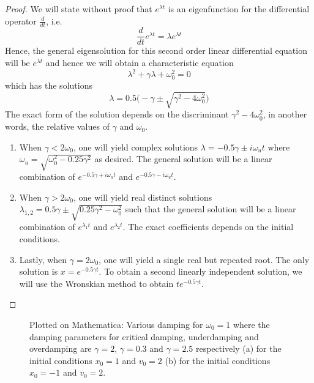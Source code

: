 \documentclass[a4paper]{article}
\begin{document}
\begin{proof}
We will state without proof that $e^{\lambda t}$ is an eigenfunction for the differential operator $\frac{d}{dt}$, i.e.
$$\frac{d}{dt}e^{\lambda t}=\lambda e^{\lambda t}$$
Hence, the general eigensolution for this second order linear differential equation will be $e^{\lambda t}$ and hence we will obtain a characteristic equation
$$\lambda^2+\gamma\lambda+\omega_0^2=0$$
which has the solutions
$$\lambda=0.5\bigg(-\gamma\pm\sqrt{\gamma^2-4\omega_0^2}\bigg)$$
The exact form of the solution depends on the discriminant $\gamma^2-4\omega_0^2$, in another words, the relative values of $\gamma$ and $\omega_0$. 
\begin{enumerate}
\item When $\gamma<2\omega_0$, one will yield complex solutions $\lambda=-0.5\gamma\pm i\omega_ut$ where $\omega_u=\sqrt{\omega_0^2-0.25\gamma^2}$ as desired. The general solution will be a linear combination of $e^{-0.5\gamma+i\omega_ut}$ and $e^{-0.5\gamma-i\omega_ut}$. \item When $\gamma>2\omega_0$, one will yield real distinct solutions $\lambda_{1,2}=0.5\gamma\pm\sqrt{0.25\gamma^2-\omega_0^2}$ such that the general solution will be a linear combination of $e^{\lambda_1 t}$ and $e^{\lambda_2t}$. The exact coefficients depends on the initial conditions. 
\item Lastly, when $\gamma=2\omega_0$, one will yield a single real but repeated root. The only solution is $x=e^{-0.5\gamma t}$. To obtain a second linearly independent solution, we will use the Wronskian method to obtain $te^{-0.5\gamma t}$.
\end{enumerate}
\end{proof}
\begin{figure}[H]
\begin{minipage}{\linewidth}
\end{minipage}
\caption{Plotted on Mathematica: Various damping for $\omega_0=1$ where the damping parameters for critical damping, underdamping and overdamping are $\gamma=2$, $\gamma=0.3$ and $\gamma=2.5$ respectively (a) for the initial conditions $x_0=1$ and $v_0=2$ (b) for the initial conditions $x_0=-1$ and $v_0=2$.}
\end{figure}
\end{document}
